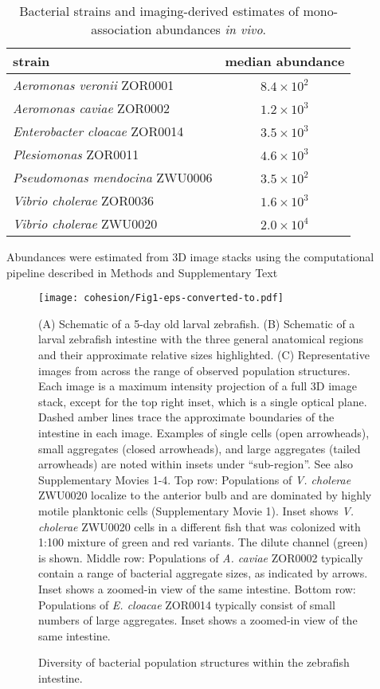 \begin{table}
\centering
\begin{tabular}{l c }
\midrule
 strain               & median abundance     \\
\midrule
\textit{Aeromonas veronii} ZOR0001 &    $8.4 \times 10^2$                \\
\textit{Aeromonas caviae} ZOR0002 &   $1.2 \times 10^3$                  \\
\textit{Enterobacter cloacae} ZOR0014   &   $ 3.5 \times 10^3$            \\
\textit{Plesiomonas} ZOR0011      &  $ 4.6 \times 10^3 $      \\
\textit{Pseudomonas mendocina} ZWU0006         &   $3.5 \times 10^2$               \\
\textit{Vibrio cholerae} ZOR0036       &    $1.6 \times 10^3$                 \\
\textit{Vibrio cholerae} ZWU0020       &    $2.0 \times 10^4$                 \\
\midrule        
\end{tabular}\caption{Bacterial strains and imaging-derived estimates of mono-association abundances \textit{in vivo}.}{ Abundances were estimated from 3D image stacks using the computational pipeline described in Methods and Supplementary Text}
\end{table}

\begin{figure}%
	\centerline{
		\texttt{[image: cohesion/Fig1-eps-converted-to.pdf]}}
	\caption{Diversity of bacterial population structures within the zebrafish intestine.}{(A) Schematic of a 5-day old larval zebrafish. (B) Schematic of a larval zebrafish intestine with the three general anatomical regions and their approximate relative sizes highlighted. (C) Representative images from across the range of observed population structures. Each image is a maximum intensity projection of a full 3D image stack, except for the top right inset, which is a single optical plane. Dashed amber lines trace the approximate boundaries of the intestine in each image. Examples of single cells (open arrowheads), small aggregates (closed arrowheads), and large aggregates (tailed arrowheads) are noted within insets under ``sub-region''. See also Supplementary Movies 1-4.  Top row: Populations of \textit{V. cholerae} ZWU0020 localize to the anterior bulb and are dominated by highly motile planktonic cells (Supplementary Movie 1). Inset shows \textit{V. cholerae} ZWU0020 cells in a different fish that was colonized with 1:100 mixture of green and red variants. The dilute channel (green) is shown. Middle row: Populations of \textit{A. caviae} ZOR0002 typically contain a range of bacterial aggregate sizes, as indicated by arrows. Inset shows a zoomed-in view of the same intestine. Bottom row: Populations of \textit{E. cloacae} ZOR0014 typically consist of small numbers of large aggregates. Inset shows a zoomed-in view of the same intestine.}
\end{figure}

